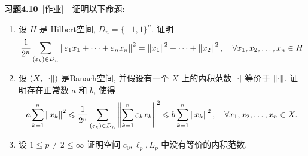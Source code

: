 	\textbf{习题4.10}\ [作业]\ \ 证明以下命题:
	\begin{enumerate}[(1)]
		\item 设 $ H $ 是 Hilbert空间, $ D_{n}=\{ -1, 1 \}^{n} $. 证明
		\[
			\frac{1}{2^{n}}\sum_{(\varepsilon_{k})\in D_{n}}\left\| \varepsilon_{1}x_{1}+\cdots+\varepsilon_{n}x_{n} \right\|^{2}=\left\| x_{1} \right\|^{2}+\cdots+\left\| x_{2} \right\|^{2}, \quad \forall x_{1}, x_{2}, \dots, x_{n}\in H
		\]
  		\item 设 $ (X, \left\| \cdot \right\|) $ 是Banach空间, 并假设有一个 $ X $ 上的内积范数 $ \left| \cdot \right|  $ 等价于 $ \left\| \cdot \right\| $. 证明存在正常数 $ a $ 和 $ b $, 使得
  		\[
			a\sum_{k=1}^{n}\left\| x_{k} \right\|^{2}\leqslant\frac{1}{2^{n}}\sum_{(\varepsilon_{k})\in D_{n}}\left\| \sum_{k=1}^{n}\varepsilon_{k}x_{k} \right\|^{2}\leqslant b\sum_{k=1}^{n}\left\| x_{k} \right\|^{2}, \quad \forall x_{1}, x_{2}, \dots, x_{n} \in X.
		\]
		\item 设 $ 1\leqslant p\ne2\leqslant\infty $ 证明空间 $ c_{0}, \ell_{p}, L_{p} $ 中没有等价的内积范数.
	\end{enumerate}
